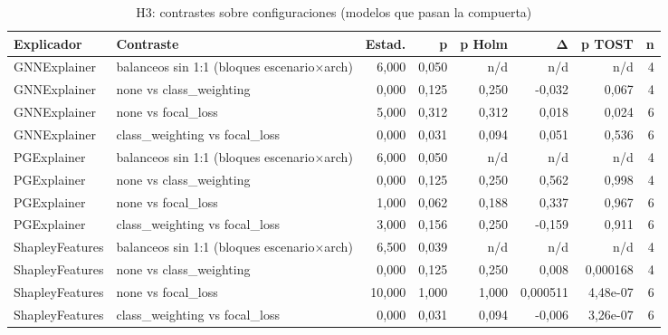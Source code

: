 \begin{table}[htbp]
\centering\small
\caption{H3: contrastes sobre configuraciones (modelos que pasan la compuerta)}
\label{tab:v4-h3}
\begin{tabular}{llrrrrrr}
\toprule
Explicador & Contraste & Estad. & p & p Holm & Δ & p TOST & n \\
\midrule
GNNExplainer & balanceos sin 1:1 (bloques escenario×arch) & 6,000 & 0,050 & n/d & n/d & n/d & 4 \\
GNNExplainer & none vs class\_weighting & 0,000 & 0,125 & 0,250 & -0,032 & 0,067 & 4 \\
GNNExplainer & none vs focal\_loss & 5,000 & 0,312 & 0,312 & 0,018 & 0,024 & 6 \\
GNNExplainer & class\_weighting vs focal\_loss & 0,000 & 0,031 & 0,094 & 0,051 & 0,536 & 6 \\
PGExplainer & balanceos sin 1:1 (bloques escenario×arch) & 6,000 & 0,050 & n/d & n/d & n/d & 4 \\
PGExplainer & none vs class\_weighting & 0,000 & 0,125 & 0,250 & 0,562 & 0,998 & 4 \\
PGExplainer & none vs focal\_loss & 1,000 & 0,062 & 0,188 & 0,337 & 0,967 & 6 \\
PGExplainer & class\_weighting vs focal\_loss & 3,000 & 0,156 & 0,250 & -0,159 & 0,911 & 6 \\
ShapleyFeatures & balanceos sin 1:1 (bloques escenario×arch) & 6,500 & 0,039 & n/d & n/d & n/d & 4 \\
ShapleyFeatures & none vs class\_weighting & 0,000 & 0,125 & 0,250 & 0,008 & 0,000168 & 4 \\
ShapleyFeatures & none vs focal\_loss & 10,000 & 1,000 & 1,000 & 0,000511 & 4,48e-07 & 6 \\
ShapleyFeatures & class\_weighting vs focal\_loss & 0,000 & 0,031 & 0,094 & -0,006 & 3,26e-07 & 6 \\
\bottomrule
\end{tabular}
\end{table}

